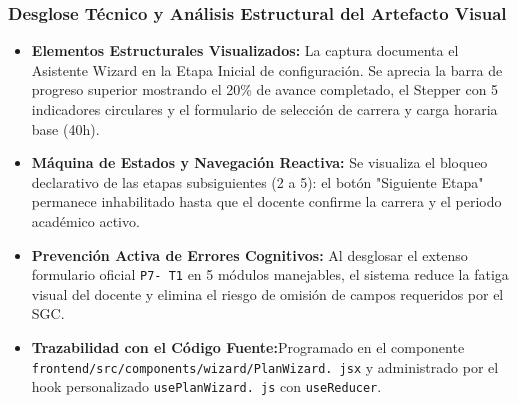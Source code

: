 \documentclass[12pt,a4paper]{article}
\begin{document}
\subsubsection*{Desglose Técnico y Análisis Estructural del Artefacto Visual}
\begin{itemize}[leftmargin=1.5em, itemsep=3pt]
    \item \textbf{Elementos Estructurales Visualizados:} La captura documenta el Asistente Wizard en la Etapa Inicial de configuración. Se aprecia la barra de progreso superior mostrando el 20\% de avance completado, el Stepper con 5 indicadores circulares y el formulario de selección de carrera y carga horaria base (40h).
    \item \textbf{Máquina de Estados y Navegación Reactiva:} Se visualiza el bloqueo declarativo de las etapas subsiguientes (2 a 5): el botón "Siguiente Etapa" permanece inhabilitado hasta que el docente confirme la carrera y el periodo académico activo.
    \item \textbf{Prevención Activa de Errores Cognitivos:} Al desglosar el extenso formulario oficial \texttt{P7- T1} en 5 módulos manejables, el sistema reduce la fatiga visual del docente y elimina el riesgo de omisión de campos requeridos por el SGC.
    \item \textbf{Trazabilidad con el Código Fuente:}\newline Programado en el componente \texttt{frontend/\allowbreak  src/\allowbreak  components/\allowbreak  wizard/\allowbreak  PlanWizard. jsx} y administrado por el hook personalizado \texttt{usePlanWizard. js} con \texttt{useReducer}.
\end{itemize}
\end{document}
